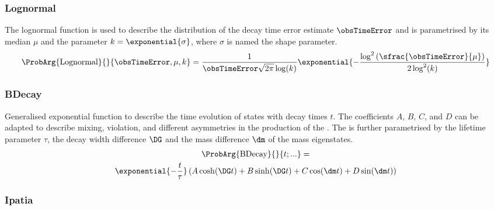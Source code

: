 \subsubsection{Lognormal}
\label{sec:measurement_of_sin2beta:likelihood_fit:pdfs:lognormal}

The lognormal function is \eg used to describe the distribution of the decay
time error estimate $\obsTimeError$ and is parametrised by its median $\mu$ and
the parameter $k = \exponential{\sigma}$, where $\sigma$ is named the shape
parameter.
%
\begin{equation}\label{eq:measurement_of_sin2beta:likelihood_fit:pdfs:lognormal}
  \ProbArg{\text{Lognormal}}{}{\obsTimeError, \mu, k} = \frac{1}{\obsTimeError \sqrt{2\pi} \log (k)} \exponential{-\frac{\log^2 \left(\sfrac{\obsTimeError}{\mu}\right)}{2 \log^2(k)}}
\end{equation}

\subsubsection{BDecay}
\label{sec:measurement_of_sin2beta:likelihood_fit:pdfs:bdecay}

Generalised exponential function to describe the time evolution of \Bmeson
states with decay times $t$. The coefficients $A$, $B$, $C$, and $D$ can be
adapted to describe \Bmeson mixing, \CP violation, and different asymmetries \eg
in the production of the \Bmesons. The \PDF is further parametrised by the
lifetime parameter $\tau$, the decay width difference $\DG$ and the mass
difference $\dm$ of the \Bmeson mass eigenstates.
%
\begin{multline}\label{eq:measurement_of_sin2beta:likelihood_fit:pdfs:bdecay}
  \ProbArg{\text{BDecay}}{}{t;...} = \\ \exponential{- \frac{t}{\tau}}\left( A \cosh (\DG t) + B \sinh (\DG t) + C \cos (\dm t) + D \sin (\dm t) \right)
\end{multline}

\subsubsection{Ipatia}
\label{sec:measurement_of_sin2beta:likelihood_fit:pdfs:ipatia}

